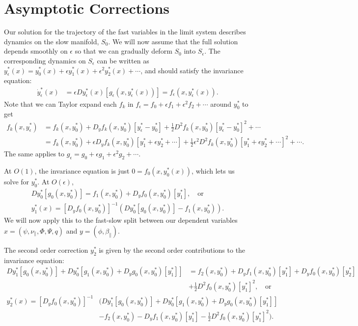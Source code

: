 \documentclass{article}
\newcommand{\para}{\parallel}
\newcommand{\ep}{\epsilon}
\newcommand{\pth} [1] {\left( #1 \right) }
\begin{document}
\section{Asymptotic Corrections} \label{asymptotic corrections}
Our solution for the trajectory of the fast variables in the limit system describes dynamics on the slow manifold, $S_0$. We will now assume that the full solution depends smoothly on $\ep$ so that we can gradually deform $S_0$ into $S_\ep$. The corresponding dynamics on $S_\ep$ can be written as $y^*_\ep(x) = y^*_0(x) + \ep y^*_1(x) + \ep^2y^*_2(x) + \cdots$, and should satisfy the invariance equation: 
\begin{align} \label{invariance}
    \dot{y}_\ep^*(x) &= \ep Dy^*_\ep(x)[g_\ep(x,y^*_\ep(x))] = f_\ep(x,y^*_\ep(x)).
\end{align}
Note that we can Taylor expand each $f_k$ in $f_\ep = f_0 + \ep f_1 + \ep^2 f_2 + \cdots$ around $y_0^*$ to get
\begin{align*} 
    f_k(x,y_\ep^*) &= f_k(x,y_0^*) + D_yf_k(x,y_0^*)[y_\ep^*-y_0^*] + \frac{1}{2}D^2f_k(x,y_0^*)[y_\ep^*-y_0^*]^2 + \cdots \\ 
    &= f_k(x,y_0^*) + \ep D_yf_k(x,y_0^*)[y_1^*+\ep y_2^*+\cdots] + \frac{1}{2}\ep^2 D^2f_k(x,y_0^*)[y_1^*+\ep y_2^*+\cdots]^2 + \cdots.
\end{align*}
The same applies to $g_\ep = g_0 + \ep g_1 + \ep^2 g_2 + \cdots$. 

At $O(1)$, the invariance equation is just $0=f_0\pth{x,y^*_0(x)}$, which lets us solve for $y_0^*$. At $O(\ep)$,    
\begin{align*}
    Dy^*_0[g_0\pth{x,y_0^*}] = f_1(x,y_0^*) + D_yf_0(x,y_0^*)[y^*_1], \quad\text{or} \\ 
    y_1^*(x) = [D_yf_0(x,y_0^*)]^{-1} \pth{Dy_0^*[g_0(x,y_0^*)] - f_1(x,y_0^*)}.  
\end{align*}
We will now apply this to the fast-slow split between our dependent variables $x=(\psi, \nu_\para, \Phi, \Psi, q)$ and $y=(\phi, \beta_\para)$. 

The second order correction $y_2^*$ is given by the second order contributions to the invariance equation: 
\begin{align*}
    Dy_1^*[g_0(x,y_0^*)] + Dy_0^*[g_1(x,y_0^*) + D_yg_0(x,y_0^*)[y_1^*]] &= f_2(x,y_0^*) + D_yf_1(x,y_0^*)[y_1^*] + D_yf_0(x,y_0^*)[y_2^*] \\ 
    &+ \frac{1}{2}D^2f_0(x,y_0^*)[y_1^*]^2, \quad\text{or} 
\end{align*}
\begin{align*}
    y_2^*(x) = [D_yf_0(x,y_0^*)]^{-1} & \biggl( Dy_1^*[g_0(x,y_0^*)] + Dy_0^*[g_1(x,y_0^*) + D_yg_0(x,y_0^*)[y_1^*]] \\ 
    &- f_2(x,y_0^*) - D_yf_1(x,y_0^*)[y_1^*] - \frac{1}{2}D^2f_0(x,y_0^*)[y_1^*]^2 \biggr). 
\end{align*}
\end{document}
